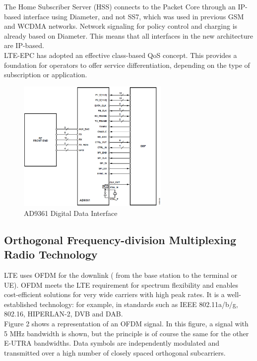 The Home Subscriber Server (HSS) connects to the Packet Core through an IP-based
interface using Diameter, and not SS7, which was used in previous GSM and WCDMA
networks. Network signaling for policy control and charging is already based on
Diameter. This means that all interfaces in the new architecture are IP-based.\\

LTE-EPC has adopted an effective class-based QoS concept. This provides a
foundation for operators to offer service differentiation, depending on the type
of subscription or application.

\begin{figure}[htbp]
    \centering
    \includegraphics[width=0.65\textwidth]{./figures/ad9361_digital_interface}
    \caption{ AD9361 Digital Data Interface
    \label{fig:ad9361diginterface}}
\end{figure}

\subsection{Orthogonal Frequency-division Multiplexing Radio Technology}

LTE uses OFDM for the downlink ( from the base station to the terminal or UE).
OFDM meets the LTE requirement for spectrum flexibility and enables cost-efficient
solutions for very wide carriers with high peak rates. It is a well-established
technology: for example, in standards such as IEEE 802.11a/b/g, 802.16, HIPERLAN-2,
DVB and DAB.\cite{introlte} \cite{umtslte}\\

Figure 2 shows a representation of an OFDM signal. In this figure, a signal with
5 MHz bandwidth is shown, but the principle is of course the same for the other
E-UTRA bandwidths. Data symbols are independently modulated and
transmitted over a high number of closely spaced orthogonal subcarriers.\\

